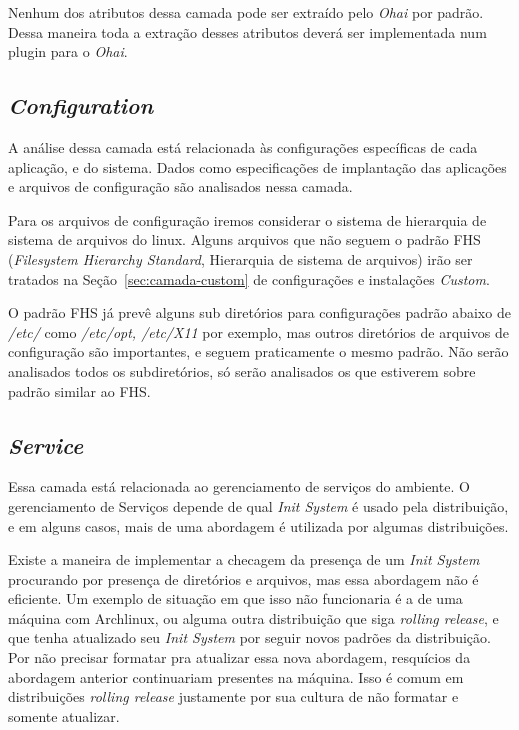 Nenhum dos atributos dessa camada pode ser extraído pelo \textit{Ohai} por
padrão. Dessa maneira toda a extração desses atributos deverá ser implementada
num plugin para o \textit{Ohai}.

\subsection{\textit{Configuration}}

A análise dessa camada está relacionada às configurações específicas de cada 
aplicação, e do sistema. Dados como especificações de implantação das
aplicações e arquivos de configuração são analisados nessa camada.

Para os arquivos de configuração iremos considerar  o sistema de hierarquia de
sistema de arquivos do linux. Alguns arquivos que não seguem o padrão FHS 
(\textit{Filesystem Hierarchy Standard}, Hierarquia de sistema de arquivos) irão
ser tratados na Seção~\ref{sec:camada-custom} de configurações e instalações \textit{Custom}.

O padrão FHS já prevê alguns sub diretórios para configurações padrão abaixo de
\textit{/etc/} como \textit{/etc/opt, /etc/X11} por exemplo, mas outros diretórios
de arquivos de configuração são importantes, e seguem praticamente o mesmo padrão.
Não serão analisados todos os subdiretórios, só serão analisados os que estiverem
sobre padrão similar ao FHS.

\subsection{\textit{Service}}

Essa camada está relacionada ao gerenciamento de serviços do ambiente.
O gerenciamento de Serviços depende de qual \textit{Init System} é usado pela
distribuição, e em alguns casos, mais de uma abordagem é utilizada por algumas
distribuições.

Existe a maneira de implementar a checagem da presença de um \textit{Init System}
procurando por presença de diretórios e arquivos, mas essa abordagem não é
eficiente. Um exemplo de situação em que isso não funcionaria é a de uma máquina
com Archlinux, ou alguma outra distribuição que siga \textit{rolling release}, e que 
tenha atualizado seu \textit{Init System} por seguir novos padrões da distribuição.
Por não precisar formatar pra atualizar essa nova abordagem, resquícios da abordagem
anterior continuariam presentes na máquina. Isso é comum em distribuições \textit{rolling
release} justamente por sua cultura de não formatar e somente atualizar.

